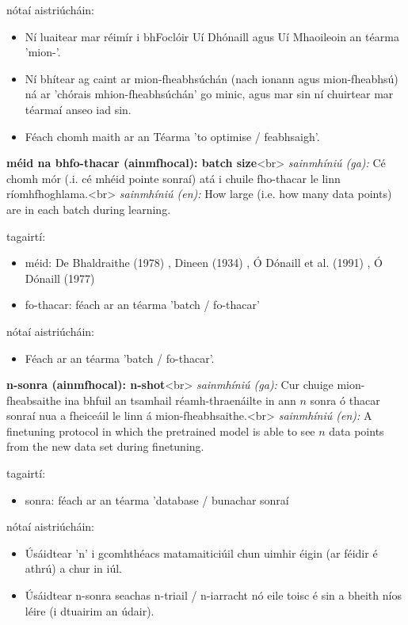 \documentclass{article}
\begin{document}
nótaí aistriúcháin:
\begin{itemize}
	\item Ní luaitear mar réimír i bhFoclóir Uí Dhónaill agus Uí Mhaoileoin an téarma 'mion-'.
	\item Ní bhítear ag caint ar mion-fheabhsúchán (nach ionann agus mion-fheabhsú) ná ar 'chórais mhion-fheabhsúchán' go minic, agus mar sin ní chuirtear mar téarmaí anseo iad sin.
	\item Féach chomh maith ar an Téarma 'to optimise / feabhsaigh'.
\end{itemize}


\textbf{méid na bhfo-thacar (ainmfhocal): batch size}<br>
\textit{sainmhíniú (ga):} Cé chomh mór (.i. cé mhéid pointe sonraí) atá i chuile fho-thacar le linn ríomhfhoghlama.<br>
\textit{sainmhíniú (en):} How large (i.e. how many data points) are in each batch during learning.

tagairtí:
\begin{itemize}
	\item méid: De Bhaldraithe (1978) \cite{de-bhaldraithe}, Dineen (1934) \cite{dineen}, Ó Dónaill et al. (1991) \cite{focloir-beag}, Ó Dónaill (1977) \cite{odonaill}
	\item fo-thacar: féach ar an téarma 'batch / fo-thacar'
\end{itemize}

nótaí aistriúcháin:
\begin{itemize}
	\item Féach ar an téarma 'batch / fo-thacar'.
\end{itemize}


\textbf{n-sonra (ainmfhocal): n-shot}<br>
\textit{sainmhíniú (ga):} Cur chuige mion-fheabsaithe ina bhfuil an tsamhail réamh-thraenáilte in ann $n$ sonra ó thacar sonraí nua a fheiceáil le linn á mion-fheabhsaithe.<br>
\textit{sainmhíniú (en):} A finetuning protocol in which the pretrained model is able to see $n$ data points from the new data set during finetuning.

tagairtí:
\begin{itemize}
	\item sonra: féach ar an téarma 'database / bunachar sonraí
\end{itemize}

nótaí aistriúcháin:
\begin{itemize}
	\item Úsáidtear 'n' i gcomhthéacs matamaiticiúil chun uimhir éigin (ar féidir é athrú) a chur in iúl.
	\item Úsáidtear n-sonra seachas n-triail / n-iarracht nó eile toisc é sin a bheith níos léire (i dtuairim an údair).
\end{itemize}
\end{document}
